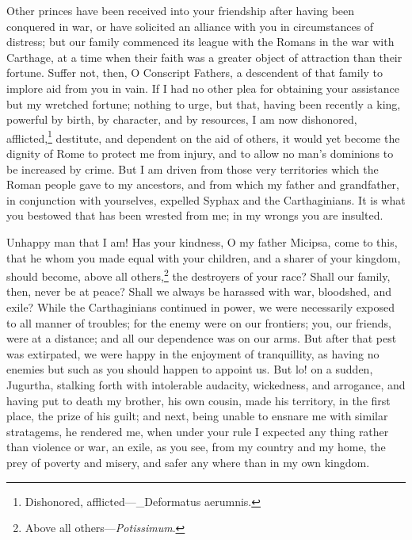 Other princes have been received into your friendship after having
been conquered in war, or have solicited an alliance with you in
circumstances of distress; but our family commenced its league with
the Romans in the war with Carthage, at a time when their faith was a
greater object of attraction than their fortune. Suffer not, then, O
Conscript Fathers, a descendent of that family to implore aid from you
in vain. If I had no other plea for obtaining your assistance but my
wretched fortune; nothing to urge, but that, having been recently a
king, powerful by birth, by character, and by resources, I am now
dishonored, afflicted,\footnote{Dishonored, afflicted—\_Deformatus aerumnis.} destitute, and dependent on the aid of
others, it would yet become the dignity of Rome to protect me from
injury, and to allow no man's dominions to be increased by crime. But
I am driven from those very territories which the Roman people gave to
my ancestors, and from which my father and grandfather, in conjunction
with yourselves, expelled Syphax and the Carthaginians. It is what you
bestowed that has been wrested from me; in my wrongs you are insulted.

Unhappy man that I am! Has your kindness, O my father Micipsa, come
to this, that he whom you made equal with your children, and a sharer
of your kingdom, should become, above all others,\footnote{Above all others—\emph{Potissimum}.} the destroyers
of your race? Shall our family, then, never be at peace? Shall we
always be harassed with war, bloodshed, and exile? While the
Carthaginians continued in power, we were necessarily exposed to all
manner of troubles; for the enemy were on our frontiers; you, our
friends, were at a distance; and all our dependence was on our arms.
But after that pest was extirpated, we were happy in the enjoyment of
tranquillity, as having no enemies but such as you should happen to
appoint us. But lo! on a sudden, Jugurtha, stalking forth with
intolerable audacity, wickedness, and arrogance, and having put to
death my brother, his own cousin, made his territory, in the first
place, the prize of his guilt; and next, being unable to ensnare me
with similar stratagems, he rendered me, when under your rule I
expected any thing rather than violence or war, an exile, as you see,
from my country and my home, the prey of poverty and misery, and safer
any where than in my own kingdom.

